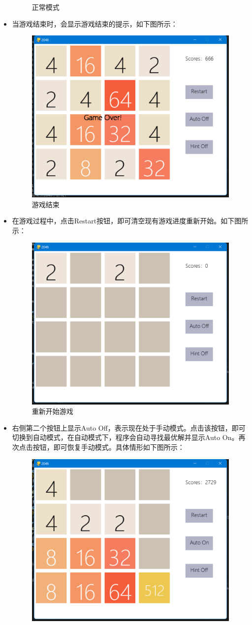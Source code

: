 \documentclass[UTF8,AutoFakeBold,AutoFakeSlant,zihao=-4]{ctexart}
\begin{document}
\begin{itemize}
\begin{figure}[!ht]
      \caption{正常模式}
      \label{fig:mergesort}
    \end{figure}
  \item 当游戏结束时，会显示游戏结束的提示，如下图所示：
    \begin{figure}[H]
      \centering
      \includegraphics[width=0.7\linewidth]{img/pic4.png}
      \caption{游戏结束}
      \label{fig:mergesort}
    \end{figure}
  \item 在游戏过程中，点击Restart按钮，即可清空现有游戏进度重新开始。如下图所示：
    \begin{figure}[H]
      \centering
      \includegraphics[width=0.6\linewidth]{img/pic5.png}
      \caption{重新开始游戏}
      \label{fig:mergesort}
    \end{figure}
  \item 右侧第二个按钮上显示Auto Off，表示现在处于手动模式。点击该按钮，即可切换到自动模式，在自动模式下，程序会自动寻找最优解并显示Auto On。再次点击按钮，即可恢复手动模式。具体情形如下图所示：
    \begin{figure}[H]
      \centering
      \includegraphics[width=0.6\linewidth]{img/pic6.png}

\end{figure}
\end{itemize}
\end{document}
